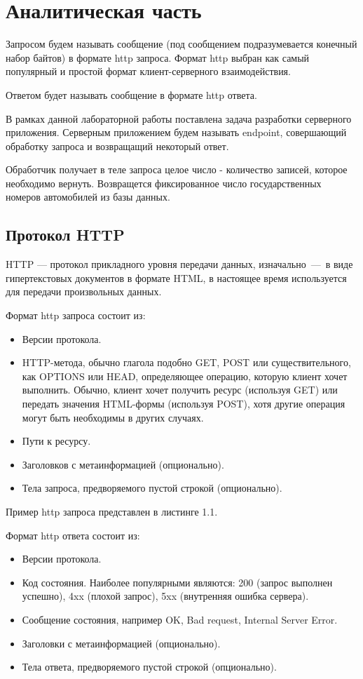 \chapter{Аналитическая часть}

Запросом будем называть сообщение (под сообщением подразумевается конечный набор байтов) в формате http запроса. Формат http выбран как самый популярный и простой формат клиент-серверного взаимодействия.

Ответом будет называть сообщение в формате http ответа.

В рамках данной лабораторной работы поставлена задача разработки серверного приложения. Серверным приложением будем называть endpoint, совершающий обработку запроса и возвращащий некоторый ответ.

Обработчик получает в теле запроса целое число - количество записей, которое необходимо вернуть. Возвращется фиксированное число государственных номеров автомобилей из базы данных.


\section{Протокол HTTP}

HTTP — протокол прикладного уровня передачи данных, изначально~—~в виде гипертекстовых документов в формате HTML, в настоящее время используется для передачи произвольных данных.

Формат http запроса состоит из:
\begin{itemize}
	\item Версии протокола.
	\item HTTP-метода, обычно глагола подобно GET, POST или существительного, как OPTIONS или HEAD, определяющее операцию, которую клиент хочет выполнить. Обычно, клиент хочет получить ресурс (используя GET) или передать значения HTML-формы (используя POST), хотя другие операция могут быть необходимы в других случаях.
	\item Пути к ресурсу.
	\item Заголовков с метаинформацией (опционально).
	\item Тела запроса, предворяемого пустой строкой (опционально).
\end{itemize}

Пример http запроса представлен в листинге 1.1.

\pagebreak
Формат http ответа состоит из:

\begin{itemize}
	\item Версии протокола.
	\item Код состояния. Наиболее популярными являются: 200 (запрос выполнен успешно), 4xx (плохой запрос), 5xx (внутренняя ошибка сервера).
	\item Сообщение состояния, например OK, Bad request, Internal Server Error.
	\item Заголовки с метаинформацией (опционально).		
	\item Тела ответа, предворяемого пустой строкой (опционально).
\end{itemize}

